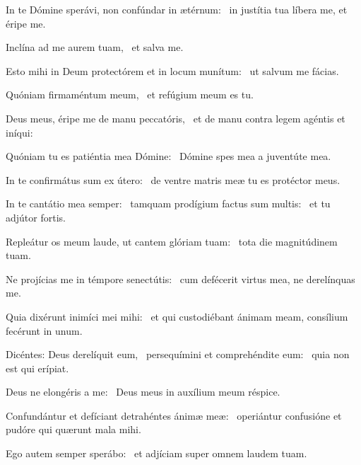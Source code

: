 \item In te Dómine sperávi, non confúndar in ætérnum:~\psstar{} in justítia tua líbera me, et éripe me.

\item Inclína ad me aurem tuam,~\psstar{} et salva me.

\item Esto mihi in Deum protectórem et in locum munítum:~\psstar{} ut salvum me fácias.

\item Quóniam firmaméntum meum,~\psstar{} et refúgium meum es tu.

\item Deus meus, éripe me de manu peccatóris,~\psstar{} et de manu contra legem agéntis et iníqui:

\item Quóniam tu es patiéntia mea Dómine:~\psstar{} Dómine spes mea a juventúte mea.

\item In te confirmátus sum ex útero:~\psstar{} de ventre matris meæ tu es protéctor meus.

\item In te cantátio mea semper:~\pscross{} tamquam prodígium factus sum multis:~\psstar{} et tu adjútor fortis.

\item Repleátur os meum laude, ut cantem glóriam tuam:~\psstar{} tota die magnitúdinem tuam.

\item Ne projícias me in témpore senectútis:~\psstar{} cum defécerit virtus mea, ne derelínquas me.

\item Quia dixérunt inimíci mei mihi:~\psstar{} et qui custodiébant ánimam meam, consílium fecérunt in unum.

\item Dicéntes: Deus derelíquit eum,~\pscross{} persequímini et comprehéndite eum:~\psstar{} quia non est qui erípiat.

\item Deus ne elongéris a me:~\psstar{} Deus meus in auxílium meum réspice.

\item Confundántur et defíciant detrahéntes ánimæ meæ:~\psstar{} operiántur confusióne et pudóre qui quærunt mala mihi.

\item Ego autem semper sperábo:~\psstar{} et adjíciam super omnem laudem tuam.

